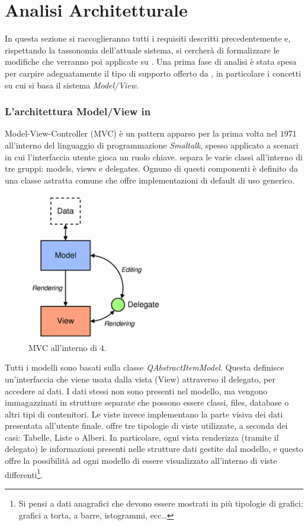 \section{Analisi Architetturale}
In questa sezione si raccoglieranno tutti i requisiti descritti precedentemente e, rispettando la tassonomia dell'attuale sistema, si cercherà di formalizzare le modifiche che verranno poi applicate su \visualnetkit{}. Una prima fase di analisi è stata spesa per carpire adeguatamente il tipo di supporto offerto da \qt{}, in particolare i concetti su cui si basa il sistema \emph{Model/View}.

\subsubsection*{L'architettura Model/View in \qt{}}
Model-View-Controller (MVC) è un pattern apparso per la prima volta nel $1971$ all'interno del linguaggio di programmazione \emph{Smaltalk}, spesso applicato a scenari in cui l'interfaccia utente gioca un ruolo chiave. \qt{} separa le varie classi all'interno di tre gruppi: models, views e delegates. Ognuno di questi componenti è definito da una classe astratta comune che offre implementazioni di default di uso generico.

\begin{figure}[!htb]
	\centering
	\includegraphics[width=6cm]{images/modelview-overview.png}
	\caption{MVC all'interno di \qt{}$4$.}
	\label{figura:qt_mvc}
\end{figure}

Tutti i modelli sono basati sulla classe \emph{QAbstractItemModel}. Questa definisce un'interfaccia che viene usata dalla vista (View) attraverso il delegato, per accedere ai dati. I dati stessi non sono presenti nel modello, ma vengono immagazzinati in strutture separate che possono essere classi, files, database o altri tipi di contenitori.
Le viste invece implementano la parte visiva dei dati presentata all'utente finale. \qt{} offre tre tipologie di viste utilizzate, a seconda dei casi: Tabelle, Liste o Alberi. In particolare, ogni vista renderizza (tramite il delegato) le informazioni presenti nelle strutture dati gestite dal modello, e questo offre la possibilità ad ogni modello di essere visualizzato all'interno di viste differenti\footnote{Si pensi a dati anagrafici che devono essere mostrati in più tipologie di grafici: grafici a torta, a barre, istogrammi, ecc\ldots}.

